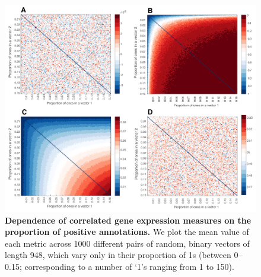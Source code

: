 \documentclass[10pt,letterpaper]{article}
\begin{document}
{\clearpage




\begin{figure}[h]
\centering
    \includegraphics[width=1\textwidth]{CoexpressionMeasures.pdf}
\caption{
\label{fig:S_propOnes}
\textbf{Dependence of correlated gene expression measures on the proportion of positive annotations.}
We plot the mean value of each metric across 1000 different pairs of random, binary vectors of length 948, which vary only in their proportion of 1s (between 0--0.15; corresponding to a number of `1's ranging from 1 to 150).
}
\end{figure}}
\end{document}
